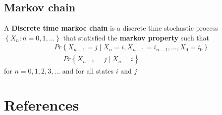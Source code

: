 \documentclass{article}
\theoremstyle{remark}
\begin{document}
\subsection{Markov chain}%
\label{sub:markov_chain}


\begin{definition}
  A \textbf{ Discrete time markoc chain}  is a discrete time stochastic process $\left\{ X_{n} : n = 0,1,\ldots \right\}$ that statisfied the \textbf{markov property}  such that \[
  \begin{split}
       & Pr \left \{ X_{n-1} = j  \mid  X_{n} = i ,    X_{n-1} = i_{n-1} , \ldots, X_{0} = i_{0} \right \}  \\
    &=  Pr \left \{ X_{n+1} = j  \mid  X_{n} = i \right \}  
  \end{split} 
  \] 
  for $n = 0,1,2,3, \ldots$ and for all states $i$ and $j$
\end{definition}







\section{References}%
\label{sec:references}





\end{document}
